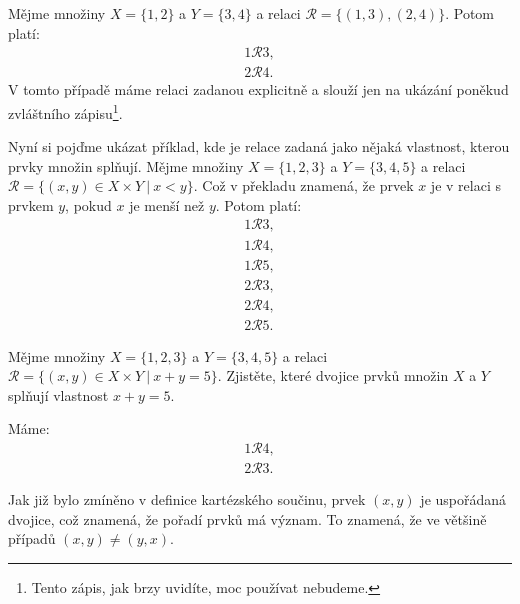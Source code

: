 \begin{example}
  Mějme množiny $X = \{1, 2\}$ a $Y = \{3, 4\}$ a relaci $\mathcal R = \{(1, 3), (2, 4)\}$. Potom platí:
  \begin{align*}
    1\mathcal R3,\\
    2\mathcal R4.
  \end{align*}
V tomto případě máme relaci zadanou explicitně a slouží jen na ukázání poněkud zvláštního zápisu\footnote{Tento zápis, jak brzy uvidíte, moc používat nebudeme.}.
\end{example}

\begin{example}
  Nyní si pojďme ukázat příklad, kde je relace zadaná jako nějaká vlastnost, kterou prvky množin splňují. Mějme množiny $X = \{1, 2, 3\}$ a $Y = \{3, 4, 5\}$ a relaci $\mathcal R = \{(x, y)\in X\times Y\ |\ x < y\}$. Což v překladu znamená, že prvek $x$ je v relaci s prvkem $y$, pokud $x$ je menší než $y$. Potom platí:
  \begin{align*}
    1\mathcal R3,\\
    1\mathcal R4,\\
    1\mathcal R5,\\
    2\mathcal R3,\\
    2\mathcal R4,\\
    2\mathcal R5.
  \end{align*}

\end{example}

\begin{problem}
  Mějme množiny $X = \{1, 2, 3\}$ a $Y = \{3, 4, 5\}$ a relaci $\mathcal R = \{(x, y)\in X\times Y\ |\ x + y = 5\}$. Zjistěte, které dvojice prvků množin $X$ a $Y$ splňují vlastnost $x + y = 5$.
\end{problem}

\begin{solution}
  Máme:
  \begin{align*}
    1\mathcal R4,\\
    2\mathcal R3.
  \end{align*}
\end{solution}

\begin{note}
  Jak již bylo zmíněno v definice kartézského součinu, prvek $(x, y)$ je uspořádaná dvojice, což znamená, že pořadí prvků má význam. To znamená, že ve většině případů $(x, y)\neq(y, x)$. 
\end{note}

